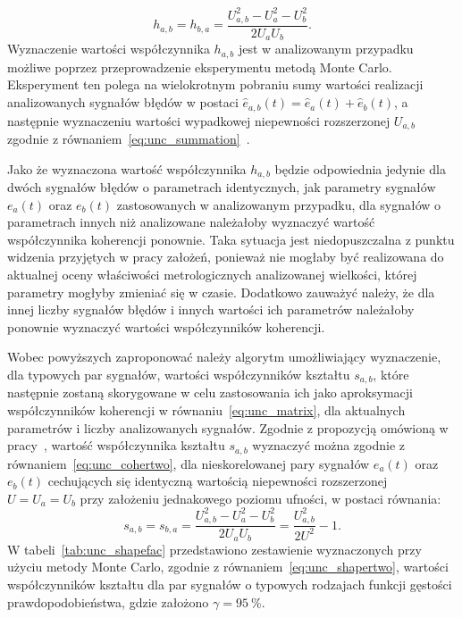 \begin{equation}
h_{a,b} = h_{b,a} = \frac{U_{a,b}^{2} - U_{a}^{2} - U_{b}^{2}}{2 U_{a} U_{b}} \label{eq:unc_cohertwo}.
\end{equation}
Wyznaczenie wartości współczynnika $h_{a,b}$ jest w analizowanym przypadku możliwe poprzez przeprowadzenie eksperymentu metodą Monte Carlo. Eksperyment ten polega na wielokrotnym pobraniu sumy wartości realizacji analizowanych sygnałów błędów w postaci $\hat{e}_{a,b}(t) = \hat{e}_{a}(t) + \hat{e}_{b}(t)$, a następnie wyznaczeniu wartości wypadkowej niepewności rozszerzonej $U_{a,b}$ zgodnie z równaniem~\eqref{eq:unc_summation}~\cite{jcgm_montecarlo, jcgm_guide}.

Jako że wyznaczona wartość współczynnika $h_{a,b}$ będzie odpowiednia jedynie dla dwóch sygnałów błędów o parametrach identycznych, jak parametry sygnałów $e_{a}(t)$ oraz $e_{b}(t)$ zastosowanych w analizowanym przypadku, dla sygnałów o parametrach innych niż analizowane należałoby wyznaczyć wartość współczynnika koherencji ponownie. Taka sytuacja jest niedopuszczalna z punktu widzenia przyjętych w pracy założeń, ponieważ nie mogłaby być realizowana do aktualnej oceny właściwości metrologicznych analizowanej wielkości, której parametry mogłyby zmieniać się w czasie. Dodatkowo zauważyć należy, że dla innej liczby sygnałów błędów i innych wartości ich parametrów należałoby ponownie wyznaczyć wartości współczynników koherencji.

Wobec powyższych zaproponować należy algorytm umożliwiający wyznaczenie, dla typowych par sygnałów, wartości współczynników kształtu $s_{a,b}$, które następnie zostaną skorygowane w celu zastosowania ich jako aproksymacji współczynników koherencji w równaniu~\eqref{eq:unc_matrix}, dla aktualnych parametrów i liczby analizowanych sygnałów. Zgodnie z propozycją omówioną w pracy~\cite{jakubiec_model}, wartość współczynnika kształtu $s_{a,b}$ wyznaczyć można zgodnie z równaniem~\eqref{eq:unc_cohertwo}, dla nieskorelowanej pary sygnałów $e_{a}(t)$ oraz $e_{b}(t)$ cechujących się identyczną wartością niepewności rozszerzonej $U = U_{a} = U_{b}$ przy założeniu jednakowego poziomu ufności, w postaci równania:
\begin{equation}
s_{a,b} = s_{b,a} = \frac{U_{a,b}^{2} - U_{a}^{2} - U_{b}^{2}}{2 U_{a} U_{b}} = \frac{U_{a,b}^{2}}{2 U^{2}} - 1 \label{eq:unc_shapertwo}.
\end{equation}
W tabeli~\ref{tab:unc_shapefac} przedstawiono zestawienie wyznaczonych przy użyciu metody Monte Carlo, zgodnie z równaniem~\eqref{eq:unc_shapertwo}, wartości współczynników kształtu dla par sygnałów o typowych rodzajach funkcji gęstości prawdopodobieństwa, gdzie założono $\gamma = \qty{95}{\percent}$.


